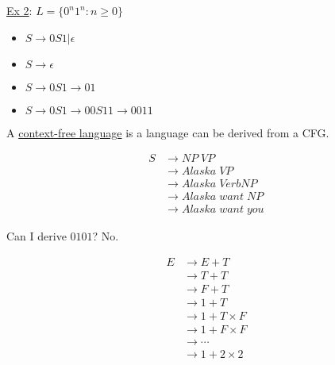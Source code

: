 \documentclass[twoside]{article}
\begin{document}
\underline{Ex 2}: $L = \{0^n1^n: n \geq 0\}$
\begin{itemize}
  \item $S \rightarrow 0S1|\epsilon$
  \item $S \rightarrow \epsilon$
  \item $S \rightarrow 0S1 \rightarrow 01$
  \item $S \rightarrow 0S1 \rightarrow 00S11 \rightarrow 0011$
\end{itemize}

A \underline{context-free language} is a language can be derived from a CFG.

\begin{align*}
  S 
  &\rightarrow NP \; VP \\
  &\rightarrow Alaska \; VP \\
  &\rightarrow Alaska \; Verb NP \\
  &\rightarrow Alaska \; want \; NP\\
  &\rightarrow Alaska \; want \; you
\end{align*}

Can I derive $0101$? No.

\begin{align*}
  E
  &\rightarrow E + T \\
  &\rightarrow T + T \\
  &\rightarrow F + T \\
  &\rightarrow 1 + T \\
  &\rightarrow 1 + T \times F \\
  &\rightarrow 1 + F \times F \\
  &\rightarrow \cdots \\
  &\rightarrow 1 + 2 \times 2
\end{align*}
\end{document}
